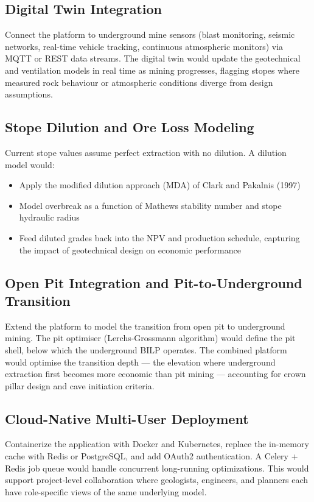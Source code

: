 \documentclass[12pt,a4paper]{article}
\begin{document}
\subsection{Digital Twin Integration}
Connect the platform to underground mine sensors (blast monitoring, seismic networks, real-time vehicle tracking, continuous atmospheric monitors) via MQTT or REST data streams. The digital twin would update the geotechnical and ventilation models in real time as mining progresses, flagging stopes where measured rock behaviour or atmospheric conditions diverge from design assumptions.

\subsection{Stope Dilution and Ore Loss Modeling}
Current stope values assume perfect extraction with no dilution. A dilution model would:
\begin{itemize}[itemsep=0.1em]
    \item Apply the modified dilution approach (MDA) of Clark and Pakalnis (1997)
    \item Model overbreak as a function of Mathews stability number and stope hydraulic radius
    \item Feed diluted grades back into the NPV and production schedule, capturing the impact of geotechnical design on economic performance
\end{itemize}

\subsection{Open Pit Integration and Pit-to-Underground Transition}
Extend the platform to model the transition from open pit to underground mining. The pit optimiser (Lerchs-Grossmann algorithm) would define the pit shell, below which the underground BILP operates. The combined platform would optimise the transition depth --- the elevation where underground extraction first becomes more economic than pit mining --- accounting for crown pillar design and cave initiation criteria.

\subsection{Cloud-Native Multi-User Deployment}
Containerize the application with Docker and Kubernetes, replace the in-memory cache with Redis or PostgreSQL, and add OAuth2 authentication. A Celery + Redis job queue would handle concurrent long-running optimizations. This would support project-level collaboration where geologists, engineers, and planners each have role-specific views of the same underlying model.
\end{document}
